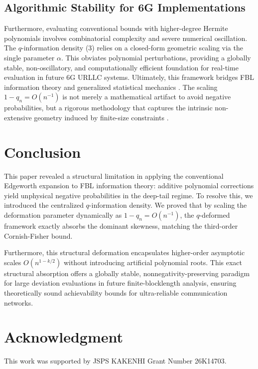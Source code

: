 \documentclass[conference]{IEEEtran}
\begin{document}
\subsection{Algorithmic Stability for 6G Implementations}
Furthermore, evaluating conventional bounds with higher-degree Hermite polynomials involves combinatorial complexity and severe numerical oscillation. The $q$-information density (3) relies on a closed-form geometric scaling via the single parameter $\alpha$. This obviates polynomial perturbations, providing a globally stable, non-oscillatory, and computationally efficient foundation for real-time evaluation in future 6G URLLC systems. Ultimately, this framework bridges FBL information theory and generalized statistical mechanics \cite{Tsallis2009, Suyari2026_JPA}. The scaling $1-q_n = O(n^{-1})$ is not merely a mathematical artifact to avoid negative probabilities, but a rigorous methodology that captures the intrinsic non-extensive geometry induced by finite-size constraints \cite{Suyari2026_PhysicaA_b}.

\section{Conclusion}
\label{sec:conclusion}
This paper revealed a structural limitation in applying the conventional Edgeworth expansion to FBL information theory: additive polynomial corrections yield unphysical negative probabilities in the deep-tail regime. To resolve this, we introduced the centralized $q$-information density. We proved that by scaling the deformation parameter dynamically as $1-q_n = O(n^{-1})$, the $q$-deformed framework exactly absorbs the dominant skewness, matching the third-order Cornish-Fisher bound. 

Furthermore, this structural deformation encapsulates higher-order asymptotic scales $O(n^{1-k/2})$ without introducing artificial polynomial roots. This exact structural absorption offers a globally stable, nonnegativity-preserving paradigm for large deviation evaluations in future finite-blocklength analysis, ensuring theoretically sound achievability bounds for ultra-reliable communication networks.

\section*{Acknowledgment}
This work was supported by JSPS KAKENHI Grant Number 26K14703.
\end{document}
